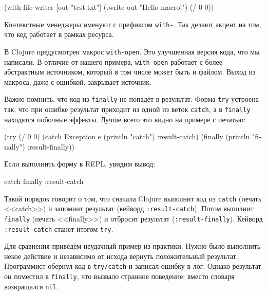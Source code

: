 \begin{english}
  \begin{clojure}
(with-file-writer [out "test.txt"]
  (.write out "Hello macro!")
  (/ 0 0))
  \end{clojure}
\end{english}

Контекстные менеджеры именуют с префиксом \verb|with-|. Так делают акцент на
том, что код работает в рамках ресурса.


В Clojure предусмотрен макрос \verb|with-open|. Это улучшенная версия кода, что
мы написали. В отличие от нашего примера, \verb|with-open| работает с более
абстрактным источником, который в том числе может быть и файлом. Выход из
макроса, даже с ошибкой, закрывает источник.

Важно помнить, что код из \verb|finally| не попадёт в результат. Форма
\verb|try| устроена так, что при ошибке результат приходит из одной из веток
\verb|catch|, а в \verb|finally| находятся побочные эффекты. Лучше всего это
видно на примере с печатью:

\begin{english}
  \begin{clojure}
(try (/ 0 0)
     (catch Exception e
       (println "catch")
       :result-catch)
     (finally
       (println "finally")
       :result-finally))
  \end{clojure}
\end{english}

\noindentnarrow
Если выполнить форму в REPL, увидим вывод:

\begin{english}
  \begin{clojure}
catch
finally
:result-catch
  \end{clojure}
\end{english}

Такой порядок говорит о том, что сначала Clojure выполнит код из \verb|catch|
(печать <<catch>>) и запомнит результат (кейворд \verb|:result-catch|). Потом выполнит
\verb|finally| (печать <<finally>>) и отбросит результат
(\verb|:result-finally|). Кейворд \verb|:result-catch| станет итогом \verb|try|.

Для сравнения приведём неудачный пример из практики. Нужно было выполнить некое
действие и независимо от исхода вернуть положительный результат. Программист
обернул код в \verb|try/catch| и записал ошибку в лог. Однако результат он
поместил в \verb|finally|, что вызвало странное поведение: вместо словаря
возвращался \verb|nil|.

